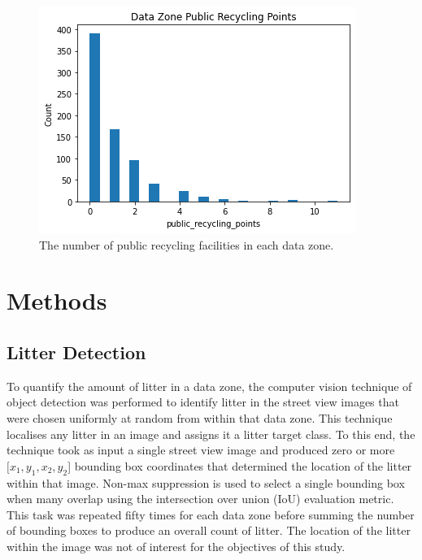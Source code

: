 \documentclass{thesis}
\begin{document}
\begin{figure}[h!]
    \centering
    \includegraphics[scale=0.6]{images/data-zone-public-recycling-points.png}
    \caption{The number of public recycling facilities in each data zone.}
    \label{fig:public-recycling-points-analysis}
\end{figure}




\chapter{Methods} \label{chapter:methods}

\section{Litter Detection}

To quantify the amount of litter in a data zone, the computer vision technique of object detection was performed to identify litter in the street view images that were chosen uniformly at random from within that data zone. This technique localises any litter in an image and assigns it a litter target class. To this end, the technique took as input a single street view image and produced zero or more $[x_1,y_1,x_2,y_2$] bounding box coordinates that determined the location of the litter within that image. Non-max suppression is used to select a single bounding box when many overlap using the intersection over union (IoU) evaluation metric. This task was repeated fifty times for each data zone before summing the number of bounding boxes to produce an overall count of litter. The location of the litter within the image was not of interest for the objectives of this study.
\end{document}
